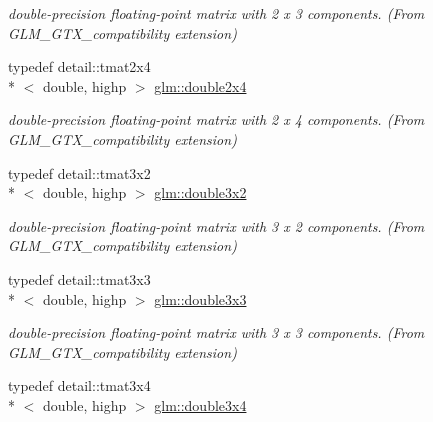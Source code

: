\begin{DoxyCompactItemize}
\begin{DoxyCompactList}\small\item\em double-\/precision floating-\/point matrix with 2 x 3 components. (From G\-L\-M\-\_\-\-G\-T\-X\-\_\-compatibility extension) \end{DoxyCompactList}\item 
\hypertarget{group__gtx__compatibility_ga063ad3c07c7650955da6ec55819f11fe}{typedef detail\-::tmat2x4\\*
$<$ double, highp $>$ \hyperlink{group__gtx__compatibility_ga063ad3c07c7650955da6ec55819f11fe}{glm\-::double2x4}}\label{group__gtx__compatibility_ga063ad3c07c7650955da6ec55819f11fe}

\begin{DoxyCompactList}\small\item\em double-\/precision floating-\/point matrix with 2 x 4 components. (From G\-L\-M\-\_\-\-G\-T\-X\-\_\-compatibility extension) \end{DoxyCompactList}\item 
\hypertarget{group__gtx__compatibility_ga1f70107ac850f512ac4e09737e1f85b7}{typedef detail\-::tmat3x2\\*
$<$ double, highp $>$ \hyperlink{group__gtx__compatibility_ga1f70107ac850f512ac4e09737e1f85b7}{glm\-::double3x2}}\label{group__gtx__compatibility_ga1f70107ac850f512ac4e09737e1f85b7}

\begin{DoxyCompactList}\small\item\em double-\/precision floating-\/point matrix with 3 x 2 components. (From G\-L\-M\-\_\-\-G\-T\-X\-\_\-compatibility extension) \end{DoxyCompactList}\item 
\hypertarget{group__gtx__compatibility_ga2b56fa7536ae728c64fde99d6618139a}{typedef detail\-::tmat3x3\\*
$<$ double, highp $>$ \hyperlink{group__gtx__compatibility_ga2b56fa7536ae728c64fde99d6618139a}{glm\-::double3x3}}\label{group__gtx__compatibility_ga2b56fa7536ae728c64fde99d6618139a}

\begin{DoxyCompactList}\small\item\em double-\/precision floating-\/point matrix with 3 x 3 components. (From G\-L\-M\-\_\-\-G\-T\-X\-\_\-compatibility extension) \end{DoxyCompactList}\item 
\hypertarget{group__gtx__compatibility_gab38107892c0116610e7de83126aff405}{typedef detail\-::tmat3x4\\*
$<$ double, highp $>$ \hyperlink{group__gtx__compatibility_gab38107892c0116610e7de83126aff405}{glm\-::double3x4}}\label{group__gtx__compatibility_gab38107892c0116610e7de83126aff405}


\end{DoxyCompactItemize}
